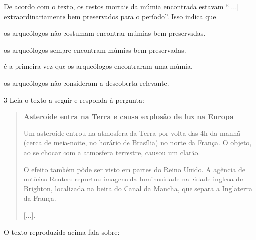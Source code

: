De acordo com o texto, os restos mortais da múmia encontrada estavam
``{[}...{]} extraordinariamente bem preservados para o período''. Isso
indica que

\begin{escolha}
\item os arqueólogos não costumam encontrar múmias bem preservadas.

\item os arqueólogos sempre encontram múmias bem preservadas.

\item é a primeira vez que os arqueólogos encontraram uma múmia.

\item os arqueólogos não consideram a descoberta relevante.
\end{escolha}


\num{3} Leia o texto a seguir e responda à pergunta:

\begin{quote}
\textbf{Asteroide entra na Terra e causa explosão de luz na Europa}

Um asteroide entrou na atmosfera da Terra por volta das 4h da manhã
(cerca de meia-noite, no horário de Brasília) no norte da França. O
objeto, ao se chocar com a atmosfera terrestre, causou um clarão.

O efeito também pôde ser visto em partes do Reino Unido. A agência de
notícias Reuters reportou imagens da luminosidade na cidade inglesa de
Brighton, localizada na beira do Canal da Mancha, que separa a
Inglaterra da França.

{[}...{]}.

\end{quote}

O texto reproduzido acima fala sobre:

